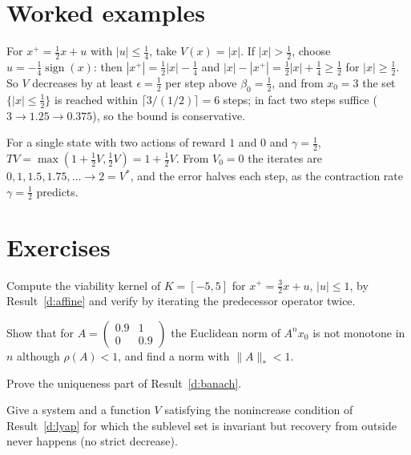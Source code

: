 \section{Worked examples}

\begin{example}\label{d:ex-lyap}
For $x^+=\tfrac12x+u$ with $|u|\le\tfrac14$, take $V(x)=|x|$. If $|x|>\tfrac12$, choose $u=-\tfrac14\operatorname{sign}(x)$: then $|x^+|=\tfrac12|x|-\tfrac14$ and $|x|-|x^+|=\tfrac12|x|+\tfrac14\ge\tfrac12$ for $|x|\ge\tfrac12$. So $V$ decreases by at least $\epsilon=\tfrac12$ per step above $\beta_0=\tfrac12$, and from $x_0=3$ the set $\{|x|\le\tfrac12\}$ is reached within $\lceil3/(1/2)\rceil=6$ steps; in fact two steps suffice ($3\to1.25\to0.375$), so the bound is conservative.
\end{example}

\begin{example}\label{d:ex-bellman}
For a single state with two actions of reward $1$ and $0$ and $\gamma=\tfrac12$, $T V=\max(1+\tfrac12V,\tfrac12V)=1+\tfrac12V$. From $V_0=0$ the iterates are $0,1,1.5,1.75,\dots\to2=V^*$, and the error halves each step, as the contraction rate $\gamma=\tfrac12$ predicts.
\end{example}

\section*{Exercises}

\begin{exercise}
Compute the viability kernel of $K=[-5,5]$ for $x^+=\tfrac32x+u$, $|u|\le1$, by Result~\ref{d:affine} and verify by iterating the predecessor operator twice.
\end{exercise}
\begin{exercise}
Show that for $A=\begin{pmatrix}0.9&1\\0&0.9\end{pmatrix}$ the Euclidean norm of $A^n x_0$ is not monotone in $n$ although $\rho(A)<1$, and find a norm with $\|A\|_*<1$.
\end{exercise}
\begin{exercise}
Prove the uniqueness part of Result~\ref{d:banach}.
\end{exercise}
\begin{exercise}
Give a system and a function $V$ satisfying the nonincrease condition of Result~\ref{d:lyap} for which the sublevel set is invariant but recovery from outside never happens (no strict decrease).
\end{exercise}
